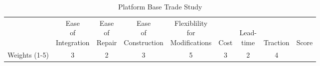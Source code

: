 \documentclass{article}
\begin{document}
		\begin{table}[H]
		\begin{adjustwidth}{-1.5in}{-1.5in}
		\centering
		\setlength{\dashlinedash}{.4pt}
		\setlength\tabcolsep{4pt}
		\def\arraystretch{1.8}
		\caption{Platform Base Trade Study}
		\label{PlatformBaseTable} 

		\vspace{1em}

		\begin{tabular}{lcccccccc}

                                                               & \makecell{Ease \\ of \\ Integration} & \makecell{Ease \\ of \\ Repair} & \makecell{Ease \\ of \\ Construction} & \makecell{Flexiblility \\ for \\ Modifications} & \makecell{\\ \\ Cost} & \makecell{ \\ Lead- \\ time} & \makecell{\\ \\ Traction} & \makecell{\\ \\ Score} \\ \hdashline
		Weights (1-5)                                          & 3                   & 2              & 3                    & 5                              & 3    & 2        & 4        &       \\ \hline
		

\end{tabular}
\end{adjustwidth}
\end{table}
\end{document}
